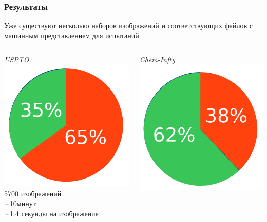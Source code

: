 \begin{frame}
  \frametitle{Результаты}
  Уже существуют несколько наборов изображений и соответствующих файлов с машинным представлением для испытаний

  \begin{columns}
    \begin{column}{0.5\textwidth}
      \begin{center}\emph{USPTO \footnotemark} \\ \includegraphics[scale=0.45]{media/pie_chart2.pdf} \\ 5700 изображений \\
      $\sim$10минут \\ $\sim$1.4 секунды на изображение \end{center}
    \end{column}
    \begin{column}{0.5\textwidth}
      \begin{center}\emph{Chem-Infty} \\ \includegraphics[scale=0.4]{media/pie_chart1.pdf} \\ 

\end{center}
\end{column}
\end{columns}
\end{frame}
